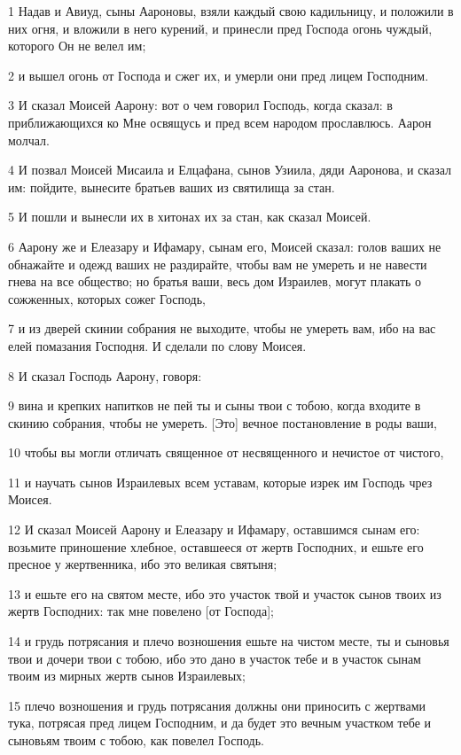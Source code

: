 \par 1 Надав и Авиуд, сыны Аароновы, взяли каждый свою кадильницу, и положили в них огня, и вложили в него курений, и принесли пред Господа огонь чуждый, которого Он не велел им;
\par 2 и вышел огонь от Господа и сжег их, и умерли они пред лицем Господним.
\par 3 И сказал Моисей Аарону: вот о чем говорил Господь, когда сказал: в приближающихся ко Мне освящусь и пред всем народом прославлюсь. Аарон молчал.
\par 4 И позвал Моисей Мисаила и Елцафана, сынов Узиила, дяди Ааронова, и сказал им: пойдите, вынесите братьев ваших из святилища за стан.
\par 5 И пошли и вынесли их в хитонах их за стан, как сказал Моисей.
\par 6 Аарону же и Елеазару и Ифамару, сынам его, Моисей сказал: голов ваших не обнажайте и одежд ваших не раздирайте, чтобы вам не умереть и не навести гнева на все общество; но братья ваши, весь дом Израилев, могут плакать о сожженных, которых сожег Господь,
\par 7 и из дверей скинии собрания не выходите, чтобы не умереть вам, ибо на вас елей помазания Господня. И сделали по слову Моисея.
\par 8 И сказал Господь Аарону, говоря:
\par 9 вина и крепких напитков не пей ты и сыны твои с тобою, когда входите в скинию собрания, чтобы не умереть. [Это] вечное постановление в роды ваши,
\par 10 чтобы вы могли отличать священное от несвященного и нечистое от чистого,
\par 11 и научать сынов Израилевых всем уставам, которые изрек им Господь чрез Моисея.
\par 12 И сказал Моисей Аарону и Елеазару и Ифамару, оставшимся сынам его: возьмите приношение хлебное, оставшееся от жертв Господних, и ешьте его пресное у жертвенника, ибо это великая святыня;
\par 13 и ешьте его на святом месте, ибо это участок твой и участок сынов твоих из жертв Господних: так мне повелено [от Господа];
\par 14 и грудь потрясания и плечо возношения ешьте на чистом месте, ты и сыновья твои и дочери твои с тобою, ибо это дано в участок тебе и в участок сынам твоим из мирных жертв сынов Израилевых;
\par 15 плечо возношения и грудь потрясания должны они приносить с жертвами тука, потрясая пред лицем Господним, и да будет это вечным участком тебе и сыновьям твоим с тобою, как повелел Господь.
